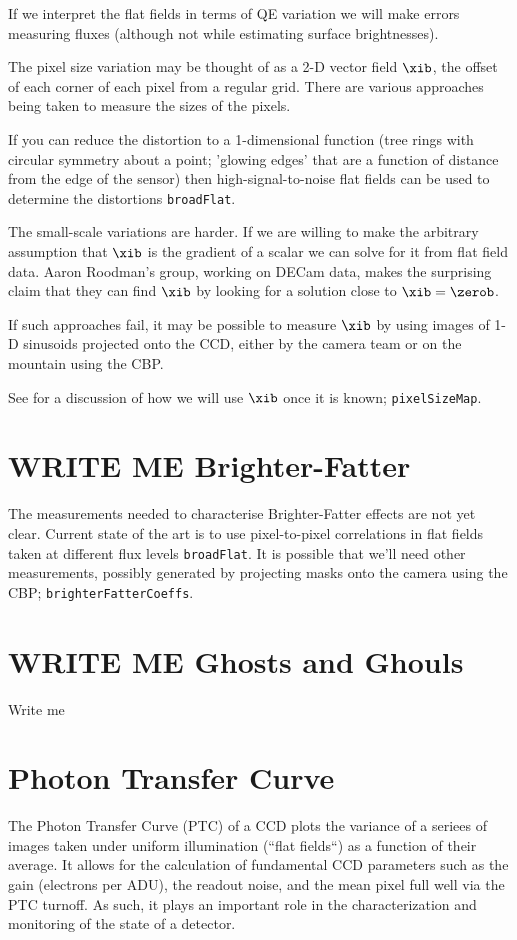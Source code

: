 \documentclass[DM,authoryear,toc,lsstdraft]{lsstdoc}
\newcommand{\inputData}[1]{\texttt{#1}}
\newcommand{\outputData}[1]{\texttt{#1}}
\begin{document}
If we interpret the flat fields in terms of QE variation we will make errors measuring fluxes (although
not while estimating surface brightnesses).

The pixel size variation may be thought of as a 2-D vector field $\xib$, the offset of each corner of each
pixel from a regular grid. There are various approaches being taken to measure the sizes of the pixels.

If you can reduce the distortion
to a 1-dimensional function (\eg tree rings with circular symmetry about a point; 'glowing edges' that are
a function of distance from the edge of the sensor) then high-signal-to-noise flat fields can be used to
determine the distortions \inputData{broadFlat}.

The small-scale variations are harder.  If we are willing to make the arbitrary assumption that $\xib$ is the
gradient of a scalar we can solve for it from flat field data.  Aaron Roodman's group, working on DECam data,
makes the surprising claim that they can find $\xib$ by looking for a solution close to $\xib = \zerob$.

If such approaches fail, it may be possible to measure $\xib$ by using images of 1-D sinusoids projected
onto the CCD, either by the camera team or on the mountain using the CBP.

See 
for a discussion of how we will use $\xib$ once it is known;
\outputData{pixelSizeMap}.

\section{WRITE ME Brighter-Fatter}

The measurements needed to characterise Brighter-Fatter effects are not yet clear.  Current state of the art
is to use pixel-to-pixel correlations in flat fields taken at different flux levels \inputData{broadFlat}.  It
is possible that we'll need other measurements, possibly generated by projecting masks onto the camera using
the CBP;  \outputData{brighterFatterCoeffs}.

\section{WRITE ME Ghosts and Ghouls}

Write me


\section{Photon Transfer Curve}
The Photon Transfer Curve (PTC) of a CCD plots the variance of a seriees of images taken under uniform illumination (``flat fields``) as a function of their average. It allows for the calculation of fundamental CCD parameters such as the gain (electrons per ADU), the readout noise, and the mean pixel full well via the PTC turnoff. As such, it plays an important role in the characterization and monitoring of the state of a detector. 
\end{document}
